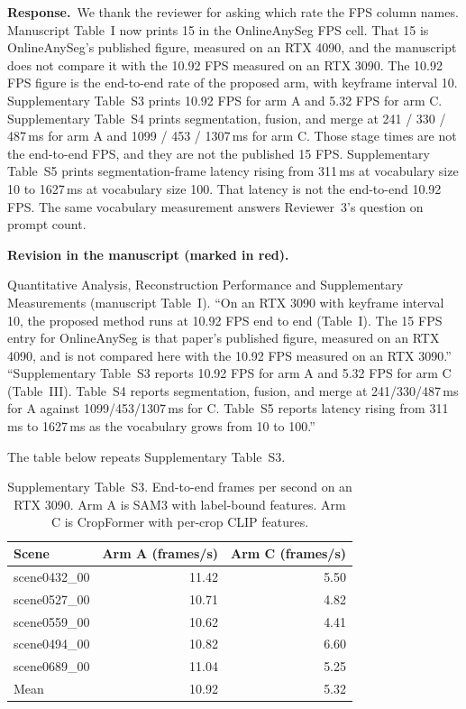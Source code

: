 \documentclass[11pt]{article}
\newcommand{\revresponse}[1]{%
  \par\noindent\textbf{Response.}\ #1\par\vspace{0.3em}}
\newcommand{\revchange}[1]{%
  \par\noindent\textbf{Revision in the manuscript (marked in red).}\par
  \noindent\textcolor{revred}{#1}\par\vspace{0.8em}}
\begin{document}
\revresponse{We thank the reviewer for asking which rate the FPS column names. Manuscript Table~I now prints 15 in the OnlineAnySeg FPS cell. That 15 is OnlineAnySeg's published figure, measured on an RTX 4090, and the manuscript does not compare it with the 10.92 FPS measured on an RTX 3090. The 10.92 FPS figure is the end-to-end rate of the proposed arm, with keyframe interval 10. Supplementary Table~S3 prints 10.92 FPS for arm A and 5.32 FPS for arm C. Supplementary Table~S4 prints segmentation, fusion, and merge at 241 / 330 / 487\,ms for arm A and 1099 / 453 / 1307\,ms for arm C. Those stage times are not the end-to-end FPS, and they are not the published 15 FPS. Supplementary Table~S5 prints segmentation-frame latency rising from 311\,ms at vocabulary size 10 to 1627\,ms at vocabulary size 100. That latency is not the end-to-end 10.92 FPS. The same vocabulary measurement answers Reviewer~3's question on prompt count.}

\revchange{Quantitative Analysis, Reconstruction Performance and Supplementary Measurements (manuscript Table~I). ``On an RTX 3090 with keyframe interval 10, the proposed method runs at 10.92 FPS end to end (Table~I). The 15 FPS entry for OnlineAnySeg is that paper's published figure, measured on an RTX 4090, and is not compared here with the 10.92 FPS measured on an RTX 3090.'' ``Supplementary Table~S3 reports 10.92 FPS for arm A and 5.32 FPS for arm C (Table~III). Table~S4 reports segmentation, fusion, and merge at 241/330/487\,ms for A against 1099/453/1307\,ms for C. Table~S5 reports latency rising from 311\,ms to 1627\,ms as the vocabulary grows from 10 to 100.''}

\noindent The table below repeats Supplementary Table~S3.

\begin{table}[ht]
\centering
\caption{Supplementary Table~S3. End-to-end frames per second on an RTX 3090. Arm A is SAM3 with label-bound features. Arm C is CropFormer with per-crop CLIP features.}
\label{tab:fps}
\small
\begin{tabular}{lrr}
\toprule
Scene & Arm A (frames/s) & Arm C (frames/s) \\
\midrule
scene0432\_00 & 11.42 & 5.50 \\
scene0527\_00 & 10.71 & 4.82 \\
scene0559\_00 & 10.62 & 4.41 \\
scene0494\_00 & 10.82 & 6.60 \\
scene0689\_00 & 11.04 & 5.25 \\
Mean & 10.92 & 5.32 \\
\bottomrule
\end{tabular}
\end{table}
\end{document}
